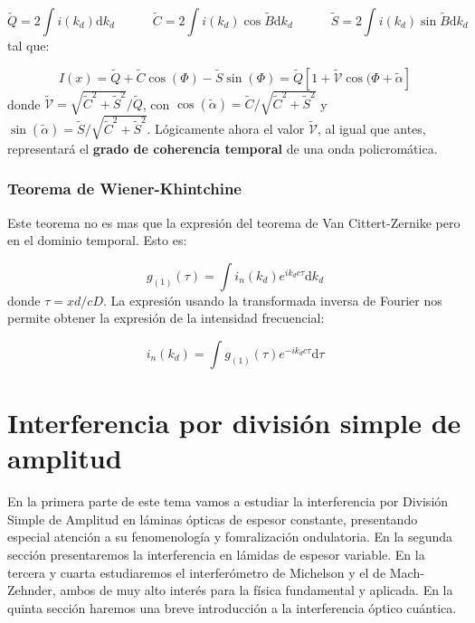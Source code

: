 \documentclass[12pt,a4paper]{book}
\numberwithin{equation}{section}
\numberwithin{figure}{section}
\newcommand{\tquad}{\quad \quad \quad}
\newcommand{\ccorchetes}[1]{\left[ #1  \right]}
\newcommand{\D}{\mathrm{d}}
\newcommand{\1}{_{(1)}}
\newcommand{\2}{_{(2)}}
\theoremstyle{definition}
\begin{document}
\begin{equation}
\tilde{Q} = 2 \int i(k_d) \D k_d \tquad \tilde{C} = 2 \int i(k_d) \cos \tilde{B} \D k_d \tquad \tilde{S}=2\int i(k_d) \sin \tilde{B} \D k_d
\end{equation}
tal que:

\begin{equation}
I(x) = \tilde{Q} + \tilde{C} \cos (\Phi) - \tilde{S} \sin (\Phi) = \tilde{Q} \ccorchetes{1+\tilde{\mathcal{V}} \cos (\Phi + \tilde{\alpha}}
\end{equation}
donde $\tilde{\mathcal{V}}=\sqrt{\tilde{C}^2+\tilde{S}^2}/\tilde{Q}$, con $\cos (\tilde{\alpha}) = \tilde{C} / \sqrt{\tilde{C}^2 + \tilde{S}^2}$ y  $\sin (\tilde{\alpha}) = \tilde{S} / \sqrt{\tilde{C}^2 + \tilde{S}^2}$. Lógicamente ahora el valor $\tilde{\mathcal{V}}$, al igual que antes, representará el \textbf{grado de coherencia temporal} de una onda policromática. 

\newpage

\subsection{Teorema de Wiener-Khintchine}

Este teorema no es mas que la expresión del teorema de Van Cittert-Zernike pero en el dominio temporal. Esto es:

\begin{equation}
g\1 (\tau) = \int i_n (k_d) e^{ik_d c \tau} \D k_d
\end{equation}
donde $\tau = xd/cD$. La expresión usando la transformada inversa de Fourier nos permite obtener la expresión de la intensidad frecuencial:

\begin{equation}
i_n (k_d)  = \int g\1 (\tau) e^{-ik_d c \tau} \D \tau
\end{equation}

\newpage

\chapter{Interferencia por división simple de amplitud}

En la primera parte de este tema vamos a estudiar la interferencia por División Simple de Amplitud en láminas ópticas de espesor constante, presentando especial atención a su fenomenología y fomralización ondulatoria. En la segunda sección presentaremos la interferencia en lámidas de espesor variable. En la tercera y cuarta estudiaremos el interferómetro de Michelson y el de Mach-Zehnder, ambos de muy alto interés para la física fundamental y aplicada. En la quinta sección haremos una breve introducción a la interferencia óptico cuántica.  
\end{document}
